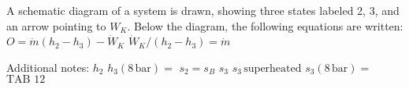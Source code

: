 A schematic diagram of a system is drawn, showing three states labeled 2, 3, and an arrow pointing to \( W_K \). Below the diagram, the following equations are written:  
\( O = \dot{m} (h_2 - h_3) - \dot{W}_K \)  
\( \dot{W}_K / (h_2 - h_3) = \dot{m} \)  

Additional notes:  
\( h_2 \)  
\( h_3 (8 \, \text{bar}) = \)  
\( s_2 = s_B \)  
\( s_3 \)  
\( s_3 \, \text{superheated} \)  
\( s_3 (8 \, \text{bar}) = \)  
\( \text{TAB 12} \)